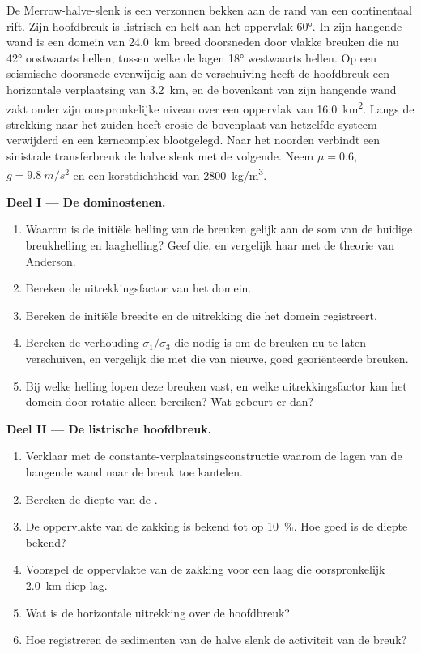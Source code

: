 \begin{problem}
\label{pb:b3:extension-strike-slip:1}
De Merrow-halve-slenk is een verzonnen bekken aan de rand van een continentaal
rift. Zijn hoofdbreuk is listrisch en helt aan het oppervlak \ang{60}. In
zijn hangende wand is een domein van \qty{24.0}{km} breed doorsneden door vlakke breuken die nu
\ang{42} oostwaarts hellen, tussen welke de lagen \ang{18} westwaarts hellen. Op een seismische doorsnede
evenwijdig aan de verschuiving heeft de hoofdbreuk een horizontale verplaatsing van \qty{3.2}{km}, en de
bovenkant van zijn hangende wand zakt onder zijn oorspronkelijke niveau over een oppervlak van
\qty{16.0}{km^2}. Langs de strekking naar het zuiden heeft erosie de bovenplaat
van hetzelfde systeem verwijderd en een kerncomplex blootgelegd. Naar het noorden
verbindt een sinistrale transferbreuk de halve slenk met de volgende. Neem $\mu =
0.6$, $g = \qty{9.8}{m/s^2}$ en een korstdichtheid van
\qty{2800}{kg/m^3}.

\medskip\noindent\textbf{Deel I --- De dominostenen.}
\begin{enumerate}
  \item Waarom is de initiële helling van de breuken gelijk aan de som van de huidige
        breukhelling en laaghelling? Geef die, en vergelijk haar met de theorie van Anderson.
  \item Bereken de uitrekkingsfactor van het domein.
  \item Bereken de initiële breedte en de uitrekking die het domein registreert.
  \item Bereken de verhouding $\sigma_1/\sigma_3$ die nodig is om de breuken nu te laten verschuiven,
        en vergelijk die met die van nieuwe, goed georiënteerde breuken.
  \item Bij welke helling lopen deze breuken vast, en welke uitrekkingsfactor kan het domein
        door rotatie alleen bereiken? Wat gebeurt er dan?
\end{enumerate}

\medskip\noindent\textbf{Deel II --- De listrische hoofdbreuk.}
\begin{enumerate}[resume]
  \item Verklaar met de constante-verplaatsingsconstructie waarom de lagen van de
        hangende wand naar de breuk toe kantelen.
  \item Bereken de diepte van de .
  \item De oppervlakte van de zakking is bekend tot op \qty{10}{\percent}. Hoe goed is de diepte
        bekend?
  \item Voorspel de oppervlakte van de zakking voor een laag die oorspronkelijk \qty{2.0}{km}
        diep lag.
  \item Wat is de horizontale uitrekking over de hoofdbreuk?
  \item Hoe registreren de sedimenten van de halve slenk de activiteit van de
        breuk?
\end{enumerate}


\end{problem}
